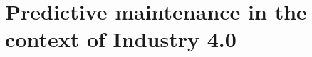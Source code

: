 \chapter{Predictive maintenance in the context of Industry 4.0}\label{ch2}
\normalsize
\minitoc
\clearpage

